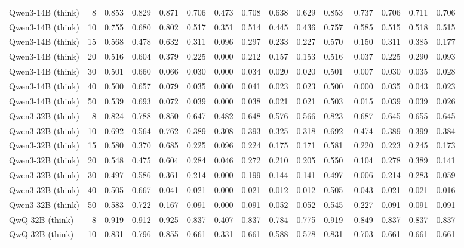 \documentclass[acmsmall,screen,review,anonymous]{acmart}
\begin{document}
\begin{landscape}
\begin{longtable}{p{4.1cm}r*{13}{r}}
Qwen3-14B (think) & 8 & 0.853 & 0.829 & 0.871 & 0.706 & 0.473 & 0.708 & 0.638 & 0.629 & 0.853 & 0.737 & 0.706 & 0.711 & 0.706 \\
Qwen3-14B (think) & 10 & 0.755 & 0.680 & 0.802 & 0.517 & 0.351 & 0.514 & 0.445 & 0.436 & 0.757 & 0.585 & 0.515 & 0.518 & 0.515 \\
Qwen3-14B (think) & 15 & 0.568 & 0.478 & 0.632 & 0.311 & 0.096 & 0.297 & 0.233 & 0.227 & 0.570 & 0.150 & 0.311 & 0.385 & 0.177 \\
Qwen3-14B (think) & 20 & 0.516 & 0.604 & 0.379 & 0.225 & 0.000 & 0.212 & 0.157 & 0.153 & 0.516 & 0.037 & 0.225 & 0.290 & 0.093 \\
Qwen3-14B (think) & 30 & 0.501 & 0.660 & 0.066 & 0.030 & 0.000 & 0.034 & 0.020 & 0.020 & 0.501 & 0.007 & 0.030 & 0.035 & 0.028 \\
Qwen3-14B (think) & 40 & 0.500 & 0.657 & 0.079 & 0.035 & 0.000 & 0.041 & 0.023 & 0.023 & 0.500 & 0.000 & 0.035 & 0.043 & 0.023 \\
Qwen3-14B (think) & 50 & 0.539 & 0.693 & 0.072 & 0.039 & 0.000 & 0.038 & 0.021 & 0.021 & 0.503 & 0.015 & 0.039 & 0.039 & 0.026 \\
Qwen3-32B (think) & 8 & 0.824 & 0.788 & 0.850 & 0.647 & 0.482 & 0.648 & 0.576 & 0.566 & 0.823 & 0.687 & 0.645 & 0.655 & 0.645 \\
Qwen3-32B (think) & 10 & 0.692 & 0.564 & 0.762 & 0.389 & 0.308 & 0.393 & 0.325 & 0.318 & 0.692 & 0.474 & 0.389 & 0.399 & 0.384 \\
Qwen3-32B (think) & 15 & 0.580 & 0.370 & 0.685 & 0.225 & 0.096 & 0.224 & 0.175 & 0.171 & 0.581 & 0.220 & 0.223 & 0.245 & 0.173 \\
Qwen3-32B (think) & 20 & 0.548 & 0.475 & 0.604 & 0.284 & 0.046 & 0.272 & 0.210 & 0.205 & 0.550 & 0.104 & 0.278 & 0.389 & 0.141 \\
Qwen3-32B (think) & 30 & 0.497 & 0.586 & 0.361 & 0.214 & 0.000 & 0.199 & 0.144 & 0.141 & 0.497 & -0.006 & 0.214 & 0.283 & 0.059 \\
Qwen3-32B (think) & 40 & 0.505 & 0.667 & 0.041 & 0.021 & 0.000 & 0.021 & 0.012 & 0.012 & 0.505 & 0.043 & 0.021 & 0.021 & 0.016 \\
Qwen3-32B (think) & 50 & 0.583 & 0.722 & 0.167 & 0.091 & 0.000 & 0.091 & 0.052 & 0.052 & 0.545 & 0.227 & 0.091 & 0.091 & 0.091 \\
QwQ-32B (think) & 8 & 0.919 & 0.912 & 0.925 & 0.837 & 0.407 & 0.837 & 0.784 & 0.775 & 0.919 & 0.849 & 0.837 & 0.837 & 0.837 \\
QwQ-32B (think) & 10 & 0.831 & 0.796 & 0.855 & 0.661 & 0.331 & 0.661 & 0.588 & 0.578 & 0.831 & 0.703 & 0.661 & 0.661 & 0.661 \\

\end{longtable}
\end{landscape}
\end{document}
